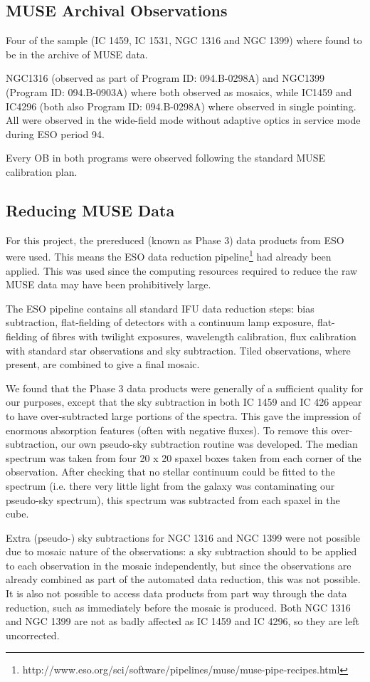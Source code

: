 	\subsection{MUSE Archival Observations}
		Four of the sample (IC 1459, IC 1531, NGC 1316 and NGC 1399) where found to be in the archive of MUSE data.

		NGC1316 (observed as part of Program ID: 094.B-0298A) and NGC1399 (Program ID: 094.B-0903A) where both observed as mosaics, while IC1459 and IC4296 (both also Program ID: 094.B-0298A) where observed in single pointing. All were observed in the wide-field mode without adaptive optics in service mode during ESO period 94. 

		Every OB in both programs were observed following the standard MUSE calibration plan.

	\subsection{Reducing MUSE Data}
		For this project, the prereduced (known as Phase 3) data products from ESO were used. This means the ESO data reduction pipeline\footnote{http://www.eso.org/sci/software/pipelines/muse/muse-pipe-recipes.html} had already been applied. This was used since the computing resources required to reduce the raw MUSE data may have been prohibitively large.

		The ESO pipeline contains all standard IFU data reduction steps: bias subtraction, flat-fielding of detectors with a continuum lamp exposure, flat-fielding of fibres with twilight exposures, wavelength calibration, flux calibration with standard star observations and sky subtraction. Tiled observations, where present, are combined to give a final mosaic.

		We found that the Phase 3 data products were generally of a sufficient quality for our purposes, except that the sky subtraction in both IC 1459 and IC 426 appear to have over-subtracted large portions of the spectra. This gave the impression of enormous absorption features (often with negative fluxes). To remove this over-subtraction, our own pseudo-sky subtraction routine was developed. The median spectrum was taken from four 20 x 20 spaxel boxes taken from each corner of the observation. After checking that no stellar continuum could be fitted to the spectrum (i.e. there very little light from the galaxy was contaminating our pseudo-sky spectrum), this spectrum was subtracted from each spaxel in the cube. 

		Extra (pseudo-) sky subtractions for NGC 1316 and NGC 1399 were not possible due to mosaic nature of the observations: a sky subtraction should to be applied to each observation in the mosaic independently, but since the observations are already combined as part of the automated data reduction, this was not possible. It is also not possible to access data products from part way through the data reduction, such as immediately before the mosaic is produced. Both NGC 1316 and NGC 1399 are not as badly affected as IC 1459 and IC 4296, so they are left uncorrected. 


